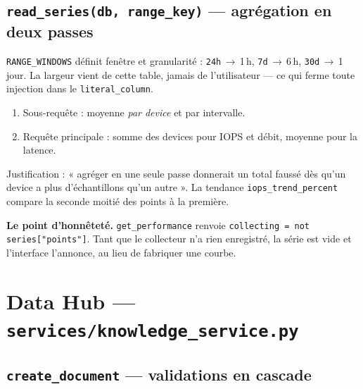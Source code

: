 \documentclass[11pt,a4paper]{report}
\newcommand{\file}[1]{\texttt{\small #1}}
\newcommand{\fn}[1]{\texttt{\small\textcolor{oasisviolet}{#1}}}
\newcommand{\arrowto}{\ensuremath{\rightarrow}}
\begin{document}
\subsection*{\fn{read\_series(db, range\_key)} --- agrégation en deux passes}
\texttt{RANGE\_WINDOWS} définit fenêtre et granularité :
\texttt{24h}\,\arrowto{}\,1\,h, \texttt{7d}\,\arrowto{}\,6\,h,
\texttt{30d}\,\arrowto{}\,1\,jour. La largeur vient de cette table, jamais de
l'utilisateur --- ce qui ferme toute injection dans le \texttt{literal\_column}.

\begin{enumerate}
  \item Sous-requête : moyenne \emph{par device} et par intervalle.
  \item Requête principale : somme des devices pour IOPS et débit, moyenne pour
  la latence.
\end{enumerate}

\noindent
Justification : « agréger en une seule passe donnerait un total faussé dès
qu'un device a plus d'échantillons qu'un autre ».
La tendance \texttt{iops\_trend\_percent} compare la seconde moitié des points à
la première.

\begin{keybox}
\textbf{Le point d'honnêteté.} \fn{get\_performance} renvoie
\texttt{collecting = not series["points"]}. Tant que le collecteur n'a rien
enregistré, la série est vide et l'interface l'annonce, au lieu de fabriquer une
courbe.
\end{keybox}

\section{Data Hub --- \file{services/knowledge\_service.py}}

\subsection*{\fn{create\_document} --- validations en cascade}
\end{document}
